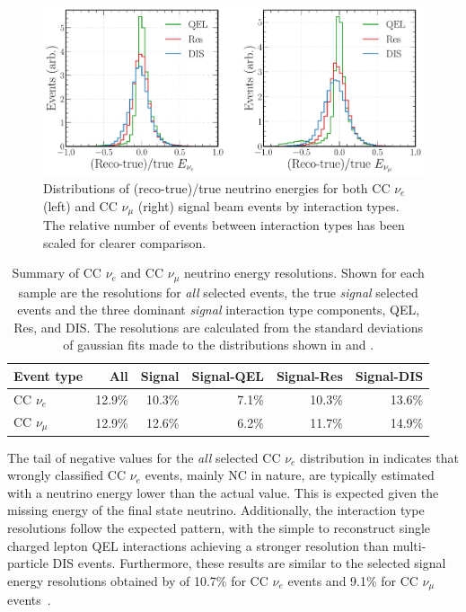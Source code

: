 \begin{figure} %
    \includegraphics[width=\textwidth]{diagrams/7-results/final_energy_frac_split.pdf}
    \caption[Distributions of (reco-true)/true neutrino energies by interaction type]
    {Distributions of (reco-true)/true neutrino energies for both CC $\nu_{e}$ (left) and CC
        $\nu_{\mu}$ (right) signal beam events by interaction types. The relative number of events
        between interaction types has been scaled for clearer comparison.}
    \label{fig:final_energy_frac_split}
\end{figure}

\begin{table}
    \begin{tabular}{lrrrrr}
        Event type     & All    & Signal & Signal-QEL & Signal-Res & Signal-DIS \\
        \midrule
        CC $\nu_{e}$   & 12.9\% & 10.3\% & 7.1\%      & 10.3\%     & 13.6\%     \\
        CC $\nu_{\mu}$ & 12.9\% & 12.6\% & 6.2\%      & 11.7\%     & 14.9\%     \\
    \end{tabular}
    \caption[Summary of CC $\nu_{e}$ and CC $\nu_{\mu}$ neutrino energy resolutions]
    {Summary of CC $\nu_{e}$ and CC $\nu_{\mu}$ neutrino energy resolutions. Shown for each sample
        are the resolutions for \emph{all} selected events, the true \emph{signal} selected events
        and the three dominant \emph{signal} interaction type components, QEL, Res, and DIS. The
        resolutions are calculated from the standard deviations of gaussian fits made to the
        distributions shown in  and
        .}
    \label{tab:energy_resolutions}
\end{table}

The tail of negative values for the \emph{all} selected CC $\nu_{e}$ distribution in
 indicates that wrongly classified CC $\nu_{e}$ events, mainly NC
in nature, are typically estimated with a neutrino energy lower than the actual value. This is
expected given the missing energy of the final state neutrino. Additionally, the interaction type
resolutions follow the expected pattern, with the simple to reconstruct single charged lepton QEL
interactions achieving a stronger resolution than multi-particle DIS events. Furthermore, these
results are similar to the selected signal energy resolutions obtained by \nova of 10.7\% for CC
$\nu_{e}$ events and 9.1\% for CC $\nu_{\mu}$ events~\cite{acero2019}.

